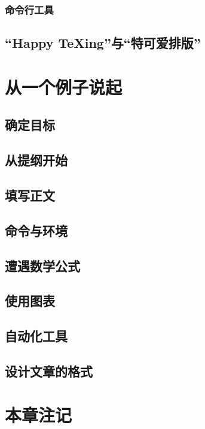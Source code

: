 \subsubsection{命令行工具}

\subsection{“Happy \TeX{}ing”与“特可爱排版”}

\section{从一个例子说起}

\subsection{确定目标}

\subsection{从提纲开始}

\subsection{填写正文}

\subsection{命令与环境}

\subsection{遭遇数学公式}

\subsection{使用图表}

\subsection{自动化工具}

\subsection{设计文章的格式}

\section*{本章注记}

